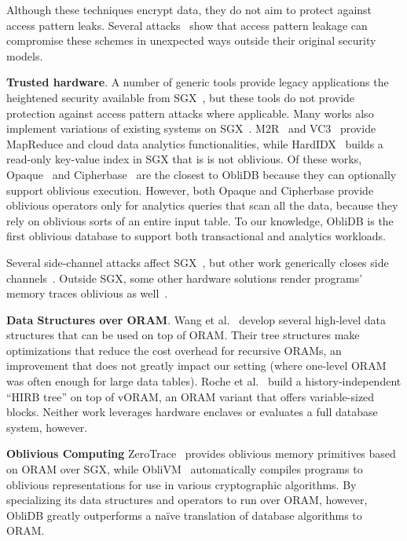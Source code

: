 \documentclass[letterpaper,twocolumn,10pt]{article}
\def\name/{ObliDB}
\begin{document}
Although these techniques encrypt data, they do not aim to protect against access pattern leaks.
Several attacks~\cite{IKK12, NKW15, CGPR15, ZKP16} show that access pattern leakage can compromise these schemes in unexpected ways outside their original security models.

\noindent \textbf{Trusted hardware}.
A number of generic tools provide legacy applications the heightened security available from SGX~\cite{BPH15, STTS17, ATG+16, HZX+16}, but these tools do not provide protection against access pattern attacks where applicable.
Many works also implement variations of existing systems on SGX~\cite{FBB+17,FVBG16,NFR+17}.
M2R~\cite{DSC+15} and VC3~\cite{SCF+15} provide MapReduce and cloud data analytics functionalities,
while HardIDX~\cite{FBB+17} builds a read-only key-value index in SGX that is is not oblivious.
Of these works, Opaque~\cite{ZDB+17} and Cipherbase~\cite{cipherbase} are the closest to \name/ because
they can optionally support oblivious execution.
However, both Opaque and Cipherbase provide oblivious operators only for analytics queries that scan all the data, because they rely on oblivious sorts of an entire input table.
To our knowledge, \name/ is the first oblivious database to support both transactional and analytics workloads.

Several side-channel attacks affect SGX~\cite{XCP15, BMD+17, LSG+16, WKPK16}, but other work generically closes side channels~\cite{SLKP17, SCNS16, RLT15, SLK+17}. Outside SGX, some other hardware solutions render programs' memory traces oblivious as well~\cite{CLD16, LHM+15, MLS+13}.

\noindent \textbf{Data Structures over ORAM}. Wang et al.~\cite{WNL+14} develop several high-level data structures that can be used on top of ORAM. Their tree structures make optimizations that reduce the cost overhead for recursive ORAMs, an improvement that does not greatly impact our setting (where one-level ORAM was often enough for large data tables). Roche et al.~\cite{RAC16} build a history-independent ``HIRB tree'' on top of vORAM, an ORAM variant that offers variable-sized blocks. Neither work leverages hardware enclaves or evaluates a full database system, however.

\noindent \textbf{Oblivious Computing}
ZeroTrace~\cite{SGF17} provides oblivious memory primitives based on ORAM over SGX, while ObliVM~\cite{oblivm} automatically compiles programs to oblivious representations for use in various cryptographic algorithms. By specializing its data structures and operators to run over ORAM, however, \name/ greatly outperforms a na\"ive translation of database algorithms to ORAM.
\end{document}
